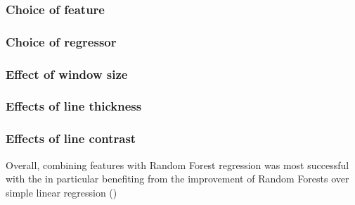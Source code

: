 
\subsubsection{Choice of feature}


\subsubsection{Choice of regressor}


\subsubsection{Effect of window size}


\subsubsection{Effects of line thickness}


\subsubsection{Effects of line contrast}


Overall, combining \dtcwt{} features with Random Forest regression was most successful with the \dtcwt{} in particular benefiting from the improvement of Random Forests over simple linear regression ()
